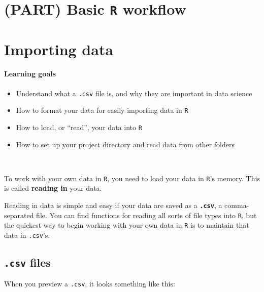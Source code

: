 \documentclass[
]{book}
\providecommand{\tightlist}{%
  \setlength{\itemsep}{0pt}\setlength{\parskip}{0pt}}
\begin{document}
\hypertarget{part-basic-r-workflow}{%
\chapter*{\texorpdfstring{(PART) Basic \texttt{R} workflow}{(PART) Basic R workflow}}\label{part-basic-r-workflow}}

\hypertarget{importing-data}{%
\chapter{Importing data}\label{importing-data}}

\hypertarget{learning-goals-9}{%
\subsubsection*{Learning goals}\label{learning-goals-9}}

\begin{itemize}
\tightlist
\item
  Understand what a \texttt{.csv} file is, and why they are important in data science
\item
  How to format your data for easily importing data in \texttt{R}
\item
  How to load, or ``read'', your data into \texttt{R}
\item
  How to set up your project directory and read data from other folders
\end{itemize}

~

To work with your own data in \texttt{R}, you need to load your data in \texttt{R}'s memory. This is called \textbf{reading in} your data.

Reading in data is simple and easy if your data are saved as a \textbf{\texttt{.csv}}, a comma-separated file. You can find functions for reading all sorts of file types into \texttt{R}, but the quickest way to begin working with your own data in \texttt{R} is to maintain that data in \texttt{.csv}'s.

\hypertarget{csv-files}{%
\section*{\texorpdfstring{\texttt{.csv} files}{.csv files}}\label{csv-files}}

When you preview a \texttt{.csv}, it looks something like this:
\end{document}
